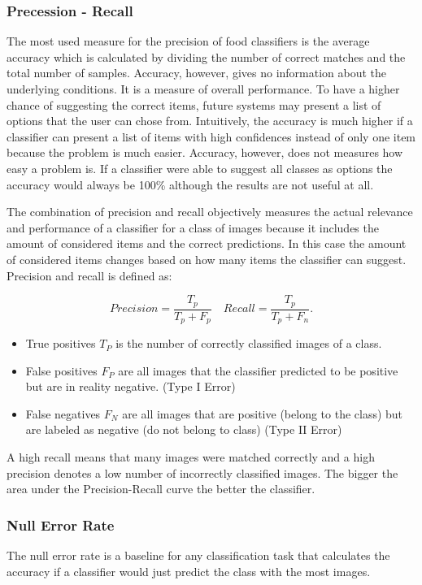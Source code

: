 \subsubsection*{Precession - Recall}
The most used measure for the precision of food classifiers is the average accuracy which is calculated by dividing the number of correct matches and the total number of samples. Accuracy, however, gives no information about the underlying conditions. It is a measure of overall performance. To have a higher chance of suggesting the correct items, future systems may present a list of options that the user can chose from. Intuitively, the accuracy is much higher if a classifier can present a list of items with high confidences instead of only one item because the problem is much easier. Accuracy, however, does not measures how easy a problem is. If a classifier were able to suggest all classes as options the accuracy would always be 100\% although the results are not useful at all.

The combination of precision and recall objectively measures the actual relevance and performance of a classifier for a class of images because it includes the amount of considered items and the correct predictions. In this case the amount of considered items changes based on how many items the classifier can suggest. Precision and recall is defined as:

\begin{equation}
Precision = \frac{T_p}{T_p+F_p} \quad Recall = \frac{T_p}{T_p+F_n}.
\end{equation}

\begin{itemize}
	\item True positives $T_P$ is the number of correctly classified images of a class.
	\item False positives $F_P$ are all images that the classifier predicted to be positive but are in reality negative. {(Type I Error)}
	\item False negatives $F_N$ are all images that are positive {(belong to the class)} but are labeled as negative {(do not belong to class)} {(Type II Error)}
\end{itemize}

A high recall means that many images were matched correctly and a high precision denotes a low number of incorrectly classified images. The bigger the area under the Precision-Recall curve the better the classifier.

\subsubsection*{Null Error Rate}
The null error rate is a baseline for any classification task that calculates the accuracy if a classifier would just predict the class with the most images.

